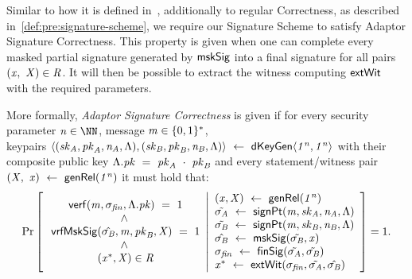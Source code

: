 Similar to how it is defined in~\cite{aumayr2020bitcoinchannels}, additionally to regular Correctness, as described  in~\cref{def:pre:signature-scheme}, we require our Signature Scheme to satisfy Adaptor Signature Correctness.
This property is given when one can complete every masked partial signature generated by $\mathsf{mskSig}$ into a final signature for all pairs $(\mathit{x} ,~ \mathit{X}) \in \mathit{R}$.
It will then be possible to extract the witness computing $\mathsf{extWit}$ with the required parameters.

\begin{definition}
    \label{def:sig:apt-sig-correctness}
    More formally, \emph{Adaptor Signature Correctness} is given if for every security parameter $\varN \in \cnstNatural$, message $\mathit{m} \in \{0,1\}^{*}$, \\ keypairs $\langle (\mathit{sk}_{\mathit{A}}, \mathit{pk}_{\mathit{A}}, \mathit{\mathit{n}_{\mathit{A}}}, \Lambda), (\mathit{sk}_{\mathit{B}}, \mathit{pk}_{\mathit{B}}, \mathit{\mathit{n}_{\mathit{B}}}, \Lambda) \rangle ~\leftarrow~ \mathsf{dKeyGen}\langle \mathit{1^n}, \mathit{1^n} \rangle$ with their composite public key $\Lambda.\mathit{pk} ~=~ \mathit{pk}_{\mathit{A}} ~\cdot~ \mathit{pk}_{\mathit{B}}$ and every statement/witness pair $(\mathit{X} ,~ \mathit{x}) ~\leftarrow~ \mathsf{genRel}(\mathit{1^n})$ it must hold that:
    \[
        \Pr\left[
        \begin{array}{c}
            \:\mathsf{verf}(\mathit{m}, \sigma_{\mathit{fin}}, \Lambda.\mathit{pk}) ~=~ 1                                         \\
            ~\land~                                                                                              \\
            \: \mathsf{vrfMskSig}(\hat{\sigma_{\mathit{B}}},\mathit{m},\mathit{pk}_{\mathit{B}},\mathit{X}) ~=~ 1             \\
            ~\land~                                                                                              \\
            \:(\mathit{x}^*, \mathit{X}) \in \mathit{R}
        \end{array}
        \middle\vert
        \begin{array}{l}
            (\mathit{x}, \mathit{X}) ~\leftarrow~ \mathsf{genRel}(\mathit{1^n}) \\
            \tilde{\sigma_{\mathit{A}}} ~\leftarrow~ \mathsf{signPt}(\mathit{m}, \mathit{sk}_{\mathit{A}}, \mathit{\mathit{n}_{\mathit{A}}}, \Lambda)        \\
            \tilde{\sigma_{\mathit{B}}} ~\leftarrow~ \mathsf{signPt}(\mathit{m}, \mathit{sk}_{\mathit{B}}, \mathit{\mathit{n}_{\mathit{B}}}, \Lambda)              \\
            \hat{\sigma_{\mathit{B}}} ~\leftarrow~ \mathsf{mskSig}(\tilde{\sigma_{\mathit{B}}}, \mathit{x})                                             \\
            \sigma_{\mathit{fin}} ~\leftarrow~ \mathsf{finSig}(\tilde{\sigma_{\mathit{A}}}, \tilde{\sigma_{\mathit{B}}})                                           \\
            \mathit{x}^* ~\leftarrow~ \mathsf{extWit}(\sigma_{\mathit{fin}}, \tilde{\sigma_{\mathit{A}}}, \hat{\sigma_{\mathit{B}}})
        \end{array}
        \right]=1.
    \]
\end{definition}